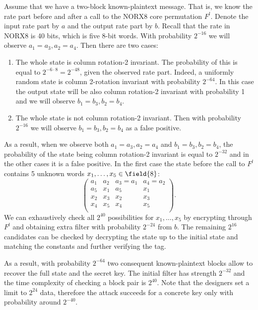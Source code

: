 Assume that we have a two-block known-plaintext message. That is, we know the rate part before and after a call to the NORX8 core permutation $F^l$. Denote the input rate part by $a$ and the output rate part by $b$. Recall that the rate in NORX8 is 40 bits, which is five 8-bit words. With probability $2^{-16}$ we will observe $a_1 = a_3, a_2 = a_4$. Then there are two cases:
\begin{enumerate}
    \item The whole state is column rotation-2 invariant. The probability of this is equal to  $2^{-6\cdot8}=2^{-48}$, given the observed rate part. Indeed, a uniformly random state is column 2-rotation invariant with probability $2^{-64}$. In this case the output state will be also column rotation-2 invariant with probability 1 and we will observe $b_1 = b_3, b_2 = b_4$.
    
    \item The whole state is not column rotation-2 invariant. Then with probability $2^{-16}$ we will observe $b_1 = b_3, b_2 = b_4$ as a false positive.
\end{enumerate}
As a result, when we observe both $a_1 = a_3, a_2 = a_4$ and $b_1 = b_3, b_2 = b_4$, the probability of the state being column rotation-2 invariant is equal to $2^{-32}$ and in the other cases it is a false positive. In the first case the state before the call to $F^l$ contains 5 unknown words $x_1,\ldots,x_5 \in \field{8}$:
$$
\begin{pmatrix}
    a_1 & a_2 & a_3=a_1 & a_4=a_2 \\
    a_5 & x_1 & a_5 & x_1 \\
    x_2 & x_3 & x_2 & x_3 \\
    x_4 & x_5 & x_4 & x_5 \\
\end{pmatrix}.
$$
We can exhaustively check all $2^{40}$ possibilities for $x_1, \ldots, x_5$ by encrypting through $F^l$ and obtaining extra filter with probability $2^{-24}$ from $b$. The remaining $2^{16}$ candidates can be checked by decrypting the state up to the initial state and matching the constants and further verifying the tag.

As a result, with probability $2^{-64}$ two consequent known-plaintext blocks allow to recover the full state and the secret key. The initial filter has strength $2^{-32}$ and the time complexity of checking a block pair is $2^{40}$. Note that the designers set a limit to $2^{24}$ data, therefore the attack succeeds for a concrete key only with probability around $2^{-40}$.


